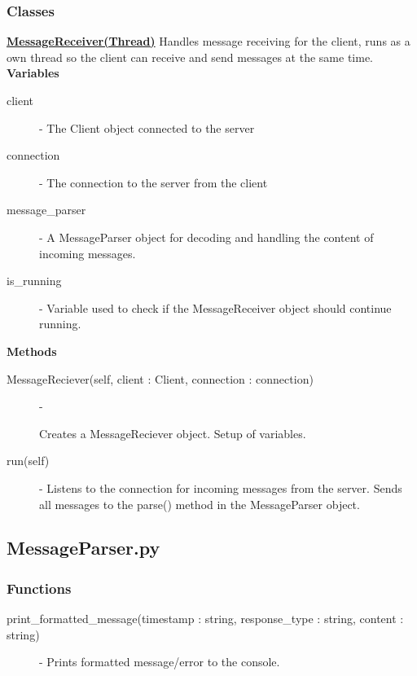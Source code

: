 \documentclass[a4paper, 12pt]{article}
\begin{document}
        \subsubsection{Classes}
            \textbf{\underline{MessageReceiver(Thread)}}
            \newline
            \newline
                Handles message receiving for the client, runs as a own thread so the client can receive and send messages at the same time.
                \newline
                \newline
                \textbf{Variables}
                    \begin{description}
                            \item[client] - The Client object connected to the server
                            \item[connection] - The connection to the server from the client
                            \item[message\_parser] - A MessageParser object for decoding and handling the content of incoming messages.
                            \item[is\_running] - Variable used to check if the MessageReceiver object should continue running.
                    \end{description}
                \textbf{Methods}
                    \begin{description}
                            \item[MessageReciever(self, client : Client, connection : connection)] -

                            Creates a MessageReciever object. Setup of variables.
                            \item[run(self)] - Listens to the connection for incoming messages from the server. Sends all messages to the parse() method in the MessageParser object.
                    \end{description}
    \subsection{MessageParser.py}
        \subsubsection{Functions}
            \begin{description}
                \item[\small{print\_formatted\_message(timestamp : string, response\_type : string, content : string)}] - Prints formatted message/error to the console.
            \end{description}
\end{document}
